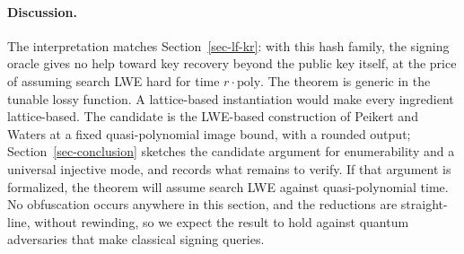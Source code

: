 \paragraph*{Discussion.} The interpretation matches Section~\ref{sec-lf-kr}: with this hash family, the signing oracle gives no help toward key recovery beyond the public key itself, at the price of assuming search LWE hard for time $r \cdot \mathrm{poly}$. The theorem is generic in the tunable lossy function. A lattice-based instantiation would make every ingredient lattice-based. The candidate is the LWE-based construction of Peikert and Waters at a fixed quasi-polynomial image bound, with a rounded output; Section~\ref{sec-conclusion} sketches the candidate argument for enumerability and a universal injective mode, and records what remains to verify. If that argument is formalized, the theorem will assume search LWE against quasi-polynomial time. No obfuscation occurs anywhere in this section, and the reductions are straight-line, without rewinding, so we expect the result to hold against quantum adversaries that make classical signing queries. 
